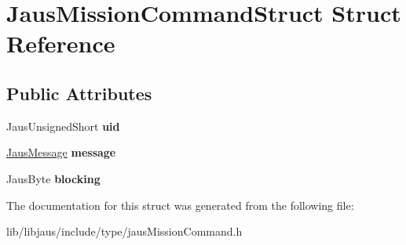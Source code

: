 \hypertarget{struct_jaus_mission_command_struct}{\section{\-Jaus\-Mission\-Command\-Struct \-Struct \-Reference}
\label{struct_jaus_mission_command_struct}
}
\subsection*{\-Public \-Attributes}
\begin{DoxyCompactItemize}
\item 
\hypertarget{struct_jaus_mission_command_struct_ad2741f5e66a1013f3a1e432097c218e8}{\-Jaus\-Unsigned\-Short {\bfseries uid}}\label{struct_jaus_mission_command_struct_ad2741f5e66a1013f3a1e432097c218e8}

\item 
\hypertarget{struct_jaus_mission_command_struct_a762cb7202852936b42a2a9aa9c237f5f}{\hyperlink{struct_jaus_message_struct}{\-Jaus\-Message} {\bfseries message}}\label{struct_jaus_mission_command_struct_a762cb7202852936b42a2a9aa9c237f5f}

\item 
\hypertarget{struct_jaus_mission_command_struct_a6cdc7c2cde2578ffbd1e64f2c80e5ad1}{\-Jaus\-Byte {\bfseries blocking}}\label{struct_jaus_mission_command_struct_a6cdc7c2cde2578ffbd1e64f2c80e5ad1}

\end{DoxyCompactItemize}


\-The documentation for this struct was generated from the following file\-:\begin{DoxyCompactItemize}
\item 
lib/libjaus/include/type/jaus\-Mission\-Command.\-h\end{DoxyCompactItemize}

